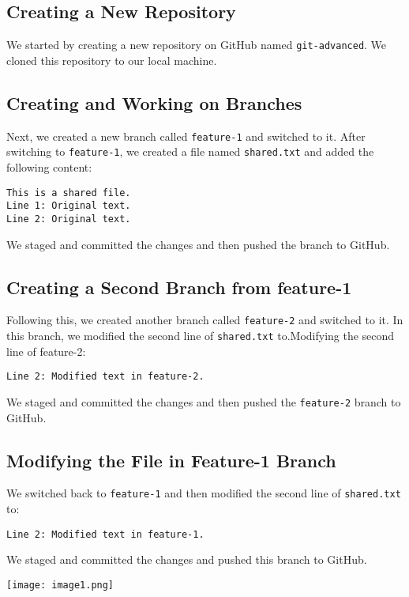 \documentclass[a4paper,12pt]{article}
\begin{document}
\subsection{ Creating a New Repository}
We started by creating a new repository on GitHub named \texttt{git-advanced}. We cloned this repository to our local machine.

\subsection{ Creating and Working on Branches}
Next, we created a new branch called \texttt{feature-1} and switched to it. After switching to \texttt{feature-1}, we created a file named \texttt{shared.txt} and added the following content:
\begin{verbatim}
This is a shared file.
Line 1: Original text.
Line 2: Original text.
\end{verbatim}
We staged and committed the changes and then pushed the branch to GitHub.

\subsection{Creating a Second Branch from feature-1}
Following this, we created another branch called \texttt{feature-2} and switched to it. In this branch, we modified the second line of \texttt{shared.txt} to.Modifying the second line of feature-2:
\begin{verbatim}
Line 2: Modified text in feature-2.
\end{verbatim}
We staged and committed the changes and then pushed the \texttt{feature-2} branch to GitHub.

\subsection{Modifying the File in Feature-1 Branch}
We switched back to \texttt{feature-1} and then modified the second line of \texttt{shared.txt} to:
\begin{verbatim}
Line 2: Modified text in feature-1.
\end{verbatim}
We staged and committed the changes and pushed this branch to GitHub.

\begin{center}
\texttt{[image: image1.png]} %
    \vspace{0.5cm}
\end{center}
\end{document}
